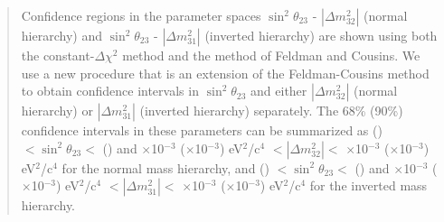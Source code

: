 \begin{frontmatter}
\begin{abstract}
Confidence regions in the parameter spaces $\sin^{2}\theta_{23}$ - $|\Delta m^{2}_{32}|$ (normal hierarchy) and
$\sin^{2}\theta_{23}$ - $|\Delta m^{2}_{31}|$ (inverted hierarchy) 
are shown using both the constant-$\Delta\chi^2$ method and the method of Feldman and Cousins.
We use a new procedure that is an extension of the Feldman-Cousins method to obtain confidence intervals in 
$\sin^{2}\theta_{23}$ and either $|\Delta m^{2}_{32}|$ (normal hierarchy) or $|\Delta m^{2}_{31}|$ (inverted hierarchy) 
separately. The 68\% (90\%) confidence intervals in these parameters can be summarized as
\resultNormalMixingOneSigmaFCLo\xspace(\resultNormalMixingTwoSigmaFCLo)
$< \sin^{2}\theta_{23} <$
\resultNormalMixingOneSigmaFCHi\xspace(\resultNormalMixingTwoSigmaFCHi)
and
\resultNormalDmsqOneSigmaFCLo$\times$10$^{-3}$ (\resultNormalDmsqTwoSigmaFCLo$\times$10$^{-3}$) eV$^{2}$/c$^{4}$
$< |\Delta m^{2}_{32}| < $
\resultNormalDmsqOneSigmaFCHi$\times$10$^{-3}$ (\resultNormalDmsqTwoSigmaFCHi$\times$10$^{-3}$) eV$^{2}$/c$^{4}$
for the normal mass hierarchy,
and
\resultInvertedMixingOneSigmaFCLo\xspace(\resultInvertedMixingTwoSigmaFCLo)
$< \sin^{2}\theta_{23} <$
\resultInvertedMixingOneSigmaFCHi\xspace(\resultInvertedMixingTwoSigmaFCHi)
and
\resultInvertedDmsqOneSigmaFCLo$\times$10$^{-3}$ (\resultInvertedDmsqTwoSigmaFCLo$\times$10$^{-3}$) eV$^{2}$/c$^{4}$
$< |\Delta m^{2}_{31}| < $
\resultInvertedDmsqOneSigmaFCHi$\times$10$^{-3}$ (\resultInvertedDmsqTwoSigmaFCHi$\times$10$^{-3}$) eV$^{2}$/c$^{4}$
for the inverted mass hierarchy.


\end{abstract}

%
%


\end{frontmatter}

\clearpage

\tableofcontents

\clearpage



